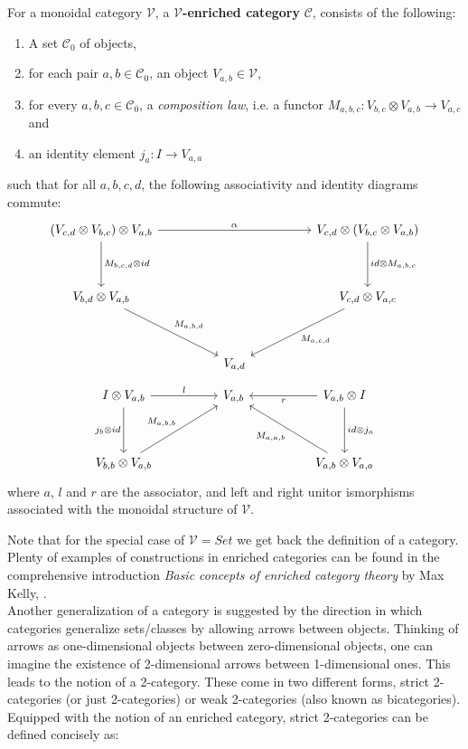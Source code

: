 \begin{defn}\label{enr-cat}
  For a monoidal category $\mathcal{V}$, a \textbf{$\mathcal{V}$-enriched category} $\mathcal{C}$, consists of the following:
  \begin{enumerate}
  \item A set $\mathcal{C}_0$ of objects,
  \item for each pair $a, b \in \mathcal{C}_0$, an object $V_{a,b} \in \mathcal{V}$,
  \item for every $a, b, c \in \mathcal{C}_0$, a \textit{composition law}, i.e. a functor $M_{a, b, c} : V_{b, c} \otimes V_{a, b} \to V_{a, c}$ and
  \item an identity element $j_a : I \to V_{a, a}$
\end{enumerate}
such that for all $a, b, c, d$, the following associativity and identity diagrams commute:
    \[
      \ti
      (V_{c, d} \otimes V_{b, c}) \otimes V_{a, b} \ar[d, "{M_{b, c, d} \otimes id}"] \ar[rr, "\alpha"] & & V_{c, d} \otimes (V_{b, c} \otimes V_{a, b}) \ar[d, "{id \otimes M_{a, b, c}}"]\\
      V_{b, d} \otimes V_{a, b} \ar[rd, "M_{a, b, d}"] & & V_{c, d} \otimes V_{a, c} \ar[ld, "M_{a, c, d}"]\\
      & V_{a, d}      &
      \kz
    \]
    \[
      \ti
      I \otimes V_{a, b} \ar[d, "j_b \otimes id", swap] \ar[r, "l"] & V_{a, b} & V_{a, b} \otimes I \ar[l, "r"] \ar[d, "id \otimes j_a"] \\
      V_{b, b} \otimes V_{a, b} \ar[ru, "M_{a, b, b}"] & & V_{a, b} \otimes V_{a, a} \ar[lu, "M_{a, a, b}"]
      \kz
    \]
    where $a$, $l$ and $r$ are the associator, and left and right unitor ismorphisms associated with the monoidal structure of $\mathcal{V}$.
\end{defn}
Note that for the special case of $\mathcal{V} = Set$ we get back the definition of a category. Plenty of examples of constructions in enriched categories can be found in the comprehensive introduction \textit{Basic concepts of enriched category theory} by Max Kelly, \cite{kelly}.\\
Another generalization of a category is suggested by the direction in which categories generalize sets/classes by allowing arrows between objects. Thinking of arrows as one-dimensional objects between zero-dimensional objects, one can imagine the existence of 2-dimensional arrows between 1-dimensional ones. This leads to the notion of a 2-category. These come in two different forms, strict 2-categories (or just 2-categories) or weak 2-categories (also known as bicategories). Equipped with the notion of an enriched category, strict 2-categories can be defined concisely as:
